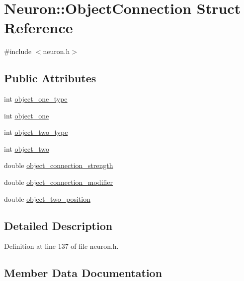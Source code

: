 \hypertarget{struct_neuron_1_1_object_connection}{}\section{Neuron\+:\+:Object\+Connection Struct Reference}
\label{struct_neuron_1_1_object_connection}


{\ttfamily \#include $<$neuron.\+h$>$}

\subsection*{Public Attributes}
\begin{DoxyCompactItemize}
\item 
int \mbox{\hyperlink{struct_neuron_1_1_object_connection_a6174f20de091bf9942b14550890f122d}{object\+\_\+one\+\_\+type}}
\item 
int \mbox{\hyperlink{struct_neuron_1_1_object_connection_af6bdcfe97aee7b1d47788f92fa57a7a8}{object\+\_\+one}}
\item 
int \mbox{\hyperlink{struct_neuron_1_1_object_connection_a69d9c1f11a36f759b6aef68236b4cd93}{object\+\_\+two\+\_\+type}}
\item 
int \mbox{\hyperlink{struct_neuron_1_1_object_connection_a457a80615d216a9db5e90159294bed48}{object\+\_\+two}}
\item 
double \mbox{\hyperlink{struct_neuron_1_1_object_connection_aaad352b3f1e712aff929a8c2fc370ac1}{object\+\_\+connection\+\_\+strength}}
\item 
double \mbox{\hyperlink{struct_neuron_1_1_object_connection_a52bbd1a5fb20ee3e5e10c36002b4dcba}{object\+\_\+connection\+\_\+modifier}}
\item 
double \mbox{\hyperlink{struct_neuron_1_1_object_connection_a2dd04a4740d11779423a2ba5e94d8f5e}{object\+\_\+two\+\_\+position}}
\end{DoxyCompactItemize}


\subsection{Detailed Description}


Definition at line 137 of file neuron.\+h.



\subsection{Member Data Documentation}
\mbox{\label{struct_neuron_1_1_object_connection_a52bbd1a5fb20ee3e5e10c36002b4dcba}} 
